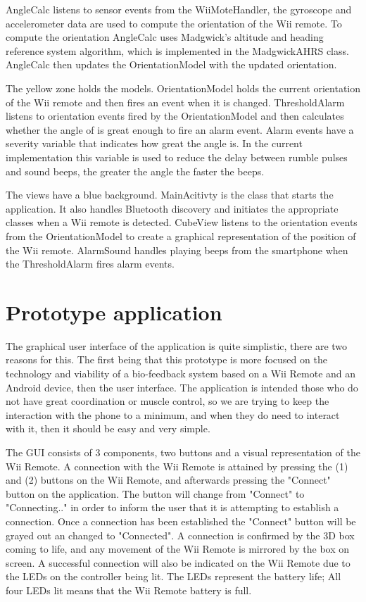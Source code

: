 AngleCalc listens to sensor events from the WiiMoteHandler, the gyroscope and accelerometer data are used to compute the orientation of the Wii remote. To compute the orientation AngleCalc uses Madgwick's altitude and heading reference system algorithm, which is implemented in the MadgwickAHRS class. AngleCalc then updates the OrientationModel with the updated orientation.

The yellow zone holds the models. OrientationModel holds the current orientation of the Wii remote and then fires an event when it is changed. ThresholdAlarm listens to orientation events fired by the OrientationModel and then calculates whether the angle of is great enough to fire an alarm event. Alarm events have a severity variable that indicates how great the angle is. In the current implementation this variable is used to reduce the delay between rumble pulses and sound beeps, the greater the angle the faster the beeps.

The views have a blue background. MainAcitivty is the class that starts the application. It also handles Bluetooth discovery and initiates the appropriate classes when a Wii remote is detected. CubeView listens to the orientation events from the OrientationModel to create a graphical representation of the position of the Wii remote. AlarmSound handles playing beeps from the smartphone when the ThresholdAlarm fires alarm events. 

\section{Prototype application}

The graphical user interface of the application is quite simplistic, there are two reasons for this. The first being that this prototype is more focused on the technology and viability of a bio-feedback system based on a Wii Remote and an Android device, then the user interface. The application is intended those who do not have great coordination or muscle control, so we are trying to keep the interaction with the phone to a minimum, and when they do need to interact with it, then it should be easy and very simple.

The GUI consists of 3 components, two buttons and a visual representation of the Wii Remote. A connection with the Wii Remote is attained by pressing the (1) and (2) buttons on the Wii Remote, and afterwards pressing the "Connect" button on the application. The button will change from "Connect" to "Connecting.." in order to inform the user that it is attempting to establish a connection. Once a connection has been established the "Connect" button will be grayed out an changed to "Connected". A connection is confirmed by the 3D box coming to life, and any movement of the Wii Remote is mirrored by the box on screen. A successful connection will also be indicated on the Wii Remote due to the LEDs on the controller being lit. The LEDs represent the battery life; All four LEDs lit means that the Wii Remote battery is full.

